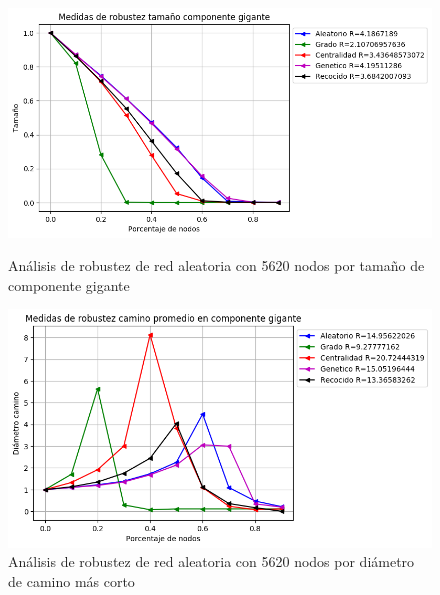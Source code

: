 \begin{figure}[!htb]
    \begin{minipage}{0.48\textwidth}
        \centering
        \includegraphics[scale=0.4]{CapituloAAnexos/imagenesAnexoC/Robustez/grafica_GC20180512_015627Random5620Nodes8804}
        \caption{Análisis de robustez de red aleatoria con 5620 nodos por tamaño de componente gigante}
    \end{minipage}\hfill
   \begin{minipage}{0.48\textwidth}
         \centering
       \includegraphics[scale=0.4]{CapituloAAnexos/imagenesAnexoC/Robustez/grafica_APL20180512_015627Random5620Nodes8804}
        \caption{Análisis de robustez de red aleatoria con 5620 nodos por diámetro de camino más corto}
    \end{minipage}
\end{figure}


